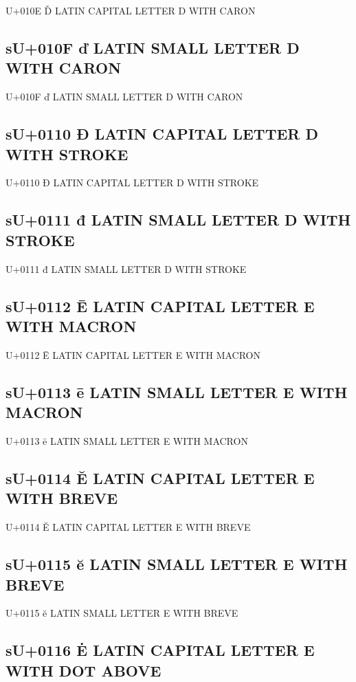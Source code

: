U+010E Ď  LATIN CAPITAL LETTER D WITH CARON

\subsection{sU+010F ď  LATIN SMALL LETTER D WITH CARON}

U+010F ď  LATIN SMALL LETTER D WITH CARON

\subsection{sU+0110 Đ  LATIN CAPITAL LETTER D WITH STROKE}

U+0110 Đ  LATIN CAPITAL LETTER D WITH STROKE

\subsection{sU+0111 đ  LATIN SMALL LETTER D WITH STROKE}

U+0111 đ  LATIN SMALL LETTER D WITH STROKE

\subsection{sU+0112 Ē  LATIN CAPITAL LETTER E WITH MACRON}

U+0112 Ē  LATIN CAPITAL LETTER E WITH MACRON

\subsection{sU+0113 ē  LATIN SMALL LETTER E WITH MACRON}

U+0113 ē  LATIN SMALL LETTER E WITH MACRON

\subsection{sU+0114 Ĕ  LATIN CAPITAL LETTER E WITH BREVE}

U+0114 Ĕ  LATIN CAPITAL LETTER E WITH BREVE

\subsection{sU+0115 ĕ  LATIN SMALL LETTER E WITH BREVE}

U+0115 ĕ  LATIN SMALL LETTER E WITH BREVE

\subsection{sU+0116 Ė  LATIN CAPITAL LETTER E WITH DOT ABOVE}

